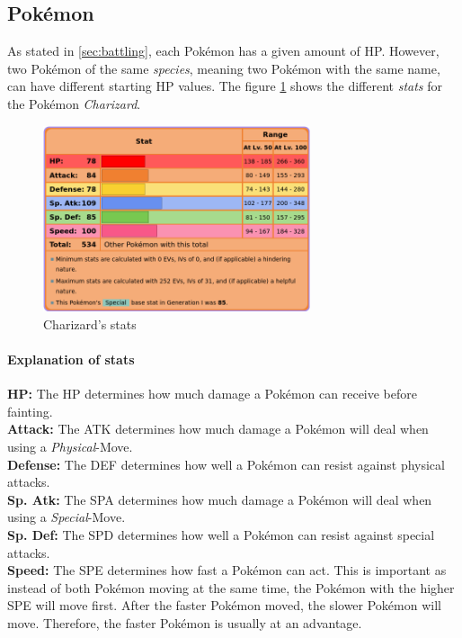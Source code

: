 \subsection{Pokémon}
\label{sec:pokemon}
As stated in \ref{sec:battling}, each Pokémon has a given amount of \ac{HP}. However, two Pokémon of the same 
\textit{species}, meaning two Pokémon with the same name, can have different starting \ac{HP} values. The figure
\ref{fig:charizard-stats} shows the different \textit{stats} for the Pokémon \textit{Charizard}.
\begin{figure}
	\centering
	\includegraphics[width=0.7\textwidth]{images/charizard-stats.png}
	\caption{Charizard's stats \cite{Bulbapedia:Charizard}}
	\label{fig:charizard-stats}
\end{figure}
\paragraph{Explanation of stats}
\textbf{HP:} The \ac{HP} determines how much damage a Pokémon can receive before fainting. \\
\textbf{Attack:} The \ac{ATK} determines how much damage a Pokémon will deal when using 
a \textit{Physical}-Move. \\
\textbf{Defense:} The \ac{DEF} determines how well a Pokémon can resist against physical attacks. \\
\textbf{Sp. Atk:} The \ac{SPA} determines how much damage a Pokémon will deal when using
a \textit{Special}-Move. \\
\textbf{Sp. Def:} The \ac{SPD} determines how well a Pokémon can resist against special attacks. \\
\textbf{Speed:} The \ac{SPE} determines how fast a Pokémon can act. This is important as instead of
both Pokémon moving at the same time, the Pokémon with the higher \ac{SPE} will move first. After 
the faster Pokémon moved, the slower Pokémon will move. Therefore, the faster Pokémon is usually at an
advantage. 
